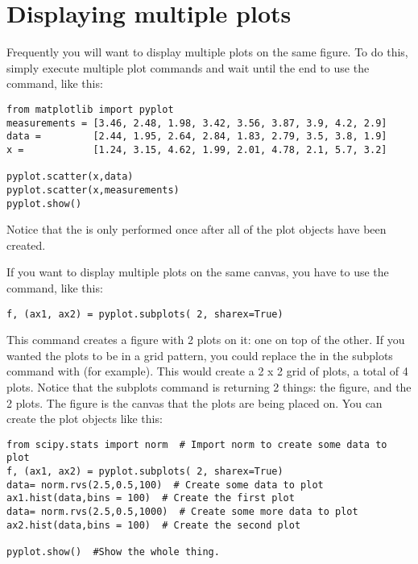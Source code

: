 \section{Displaying multiple plots}
Frequently you will want to display multiple plots on the same figure.
 To do this, simply execute multiple plot commands and wait until the
 end to use the  command, like this:
\begin{Verbatim}
from matplotlib import pyplot
measurements = [3.46, 2.48, 1.98, 3.42, 3.56, 3.87, 3.9, 4.2, 2.9]
data =         [2.44, 1.95, 2.64, 2.84, 1.83, 2.79, 3.5, 3.8, 1.9]
x =            [1.24, 3.15, 4.62, 1.99, 2.01, 4.78, 2.1, 5.7, 3.2]

pyplot.scatter(x,data)
pyplot.scatter(x,measurements)
pyplot.show()

\end{Verbatim}
Notice that the   is only performed once after
all of the plot objects have been created.

If you want to display multiple plots on the same canvas, you have to
use the  command, like this:
\begin{Verbatim}
f, (ax1, ax2) = pyplot.subplots( 2, sharex=True) 
\end{Verbatim}

This command creates a figure with 2 plots on it: one on top of the other.
If you wanted the plots to be in a grid pattern, you could replace the
 in the subplots command with  (for example).
This would create a 2 x 2 grid of plots, a total of 4 plots.  Notice
that the subplots command is returning 2 things: the figure, and the 2
plots.  The figure is the canvas that the plots are being placed on.
You can create the plot objects like this:
\begin{Verbatim}
from scipy.stats import norm  # Import norm to create some data to plot
f, (ax1, ax2) = pyplot.subplots( 2, sharex=True) 
data= norm.rvs(2.5,0.5,100)  # Create some data to plot
ax1.hist(data,bins = 100)  # Create the first plot
data= norm.rvs(2.5,0.5,1000)  # Create some more data to plot
ax2.hist(data,bins = 100)  # Create the second plot

pyplot.show()  #Show the whole thing.


\end{Verbatim}


